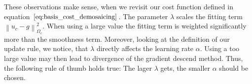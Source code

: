 \documentclass{paper}
\newcommand{\norm}[1]{\left\lVert#1\right\rVert}
\begin{document}
These observations make sense, when we revisit our cost function defined in equation $\ref{eq:basis_cost_demosaicing}$. The parameter $\lambda$ scales the fitting term $\norm{u_c - g}^2_{\Omega_{c}}$. When using a large value the fitting term is weighted significantly more than the smoothness term. Moreover, looking at the definition of our update rule, we notice, that $\lambda$ directly affects the learning rate $\alpha$. Using a too large value may then lead to divergence of the gradient descend method. Thus, the following rule of thumb holds true: The lager $\lambda$ gets, the smaller $\alpha$ should be chosen.

\begin{figure}[h!]
\begin{center}
\end{center}
\end{figure}
\end{document}
